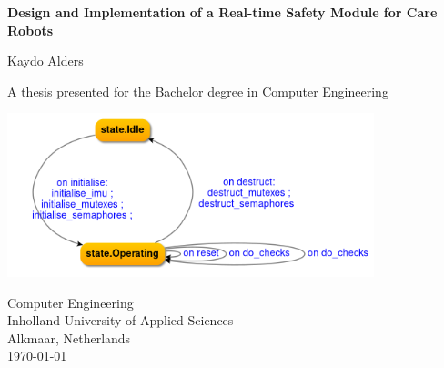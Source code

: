 \documentclass[12pt]{scrreprt}
\date{\displaydate{date}}
\begin{document}

\lstset{escapechar=@,style=customc}

\begin{titlepage}
    \begin{center}
        \vspace*{1cm}
            
        \LARGE
        \textbf{Design and Implementation of a Real-time Safety Module for Care Robots}
            
        \vspace{0.5cm}
            
        \vspace{1.5cm}
            
        Kaydo Alders
            
        \vfill
            
        A thesis presented for the Bachelor degree in Computer Engineering
            
        \vspace{0.8cm}
            
        \includegraphics[width=0.8\textwidth]{Figures/results/modelling_figures/IController/IController_state_chart.png}
        
        \vspace{0.8cm}
        
        \Large
        Computer Engineering\\
        Inholland University of Applied Sciences\\
        Alkmaar, Netherlands\\
        \large \today
            
    \end{center}
\end{titlepage}
\end{document}
